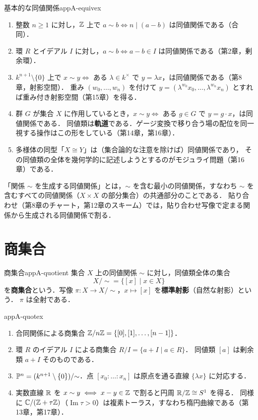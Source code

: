 \begin{myex}{基本的な同値関係}{appA-equivex}
\begin{enumerate}
\item 整数 $n\geq1$ に対し，$\mathbb{Z}$ 上で $a\sim b\iff n\mid(a-b)$ は同値関係である（合同）．
\item 環 $R$ とイデアル $I$ に対し，$a\sim b\iff a-b\in I$ は同値関係である（第2章，剰余環）．
\item $k^{n+1}\setminus\{0\}$ 上で $x\sim y\iff$ ある $\lambda\in k^\times$ で $y=\lambda x$，は同値関係である（第8章，射影空間）．
重み $(w_0,\dots,w_n)$ を付けて $y=(\lambda^{w_0}x_0,\dots,\lambda^{w_n}x_n)$ とすれば重み付き射影空間（第15章）を得る．
\item 群 $G$ が集合 $X$ に作用しているとき，$x\sim y\iff$ ある $g\in G$ で $y=g\cdot x$，は同値関係である．
同値類は\textbf{軌道}である．ゲージ変換で移り合う場の配位を同一視する操作はこの形をしている（第14章，第16章）．
\item 多様体の同型「$X\cong Y$」は（集合論的な注意を除けば）同値関係であり，
その同値類の全体を幾何学的に記述しようとするのがモジュライ問題（第16章）である．
\end{enumerate}
\end{myex}

\begin{note}
「関係 $\sim$ を生成する同値関係」とは，$\sim$ を含む最小の同値関係，すなわち
$\sim$ を含むすべての同値関係（$X\times X$ の部分集合）の共通部分のことである．
貼り合わせ（第8章のチャート，第12章のスキーム）では，貼り合わせ写像で定まる関係から生成される同値関係で割る．
\end{note}

\section{商集合}

\begin{mydef}{商集合}{appA-quotient}
集合 $X$ 上の同値関係 $\sim$ に対し，同値類全体の集合
\[
X/{\sim}=\{[x]\mid x\in X\}
\]
を\textbf{商集合}という．写像 $\pi\colon X\to X/{\sim}$，$x\mapsto[x]$ を\textbf{標準射影}（自然な射影）という．
$\pi$ は全射である．
\end{mydef}

\begin{myex}{}{appA-quotex}
\begin{enumerate}
\item 合同関係による商集合 $\mathbb{Z}/n\mathbb{Z}=\{[0],[1],\dots,[n-1]\}$．
\item 環 $R$ のイデアル $I$ による商集合 $R/I=\{a+I\mid a\in R\}$．
同値類 $[a]$ は剰余類 $a+I$ そのものである．
\item $\mathbb{P}^n=(k^{n+1}\setminus\{0\})/{\sim}$．点 $[x_0:\dots:x_n]$ は原点を通る直線 $\{\lambda x\}$ に対応する．
\item 実数直線 $\mathbb{R}$ を $x\sim y\iff x-y\in\mathbb{Z}$ で割ると円周 $\mathbb{R}/\mathbb{Z}\cong S^1$ を得る．
同様に $\mathbb{C}/(\mathbb{Z}+\tau\mathbb{Z})$（$\operatorname{Im}\tau>0$）は複素トーラス，すなわち楕円曲線である（第13章，第17章）．
\end{enumerate}
\end{myex}

